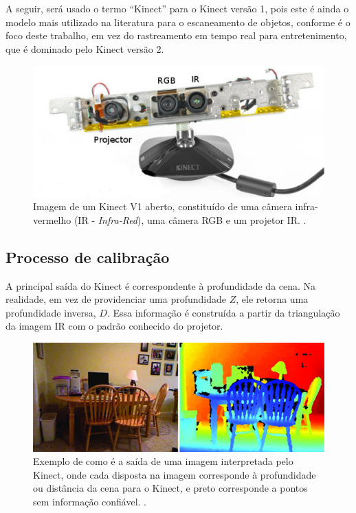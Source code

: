 A seguir, será usado o termo ``Kinect'' para o Kinect versão 1, pois este é ainda
o modelo mais utilizado na literatura para o escaneamento de objetos, conforme
é o foco deste trabalho, em vez do rastreamento em tempo real para entretenimento, que é
dominado pelo Kinect versão 2.

\begin{figure}[!h]
	\centering
	\includegraphics[width=0.5\linewidth]{figs/kinect.png}
	\caption{%
  Imagem de um Kinect V1 aberto, constituído de uma câmera infra-vermelho (IR -
  \emph{Infra-Red}), uma câmera RGB e um projetor IR.
  \protect\cite{smisek20133d}.
	}\label{fig:kinectv1}
\end{figure}

\subsection*{Processo de calibração}

A principal saída do Kinect é correspondente à profundidade da
cena. Na realidade, em vez de providenciar uma profundidade $Z$, ele retorna uma profundidade
inversa, $D$. Essa informação é construída a partir da triangulação
da imagem IR com o padrão conhecido do projetor.

\begin{figure}[!h]
	\centering
	\includegraphics[width=1\linewidth]{figs/profundidadekinect.png}
	\caption{%
  Exemplo de como é a saída de uma imagem interpretada pelo Kinect, onde cada
  disposta na imagem corresponde à profundidade ou distância da cena para
  o Kinect, e preto corresponde a pontos sem informação confiável.
	\cite{Silberman:ECCV12}.
	}\label{fig:profKinect}
\end{figure}
 
